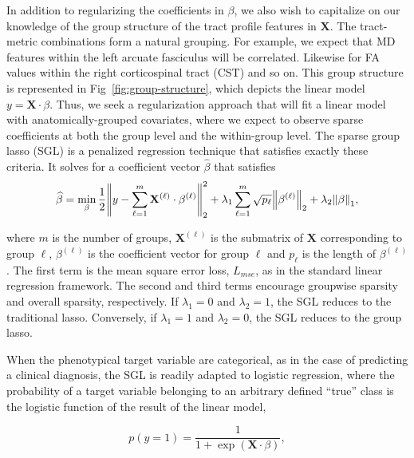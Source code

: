 In addition to regularizing the coefficients in $\beta$, we also wish to
capitalize on our knowledge of the group structure of the tract profile features
in $\mathbf{X}$. The tract-metric combinations form a natural grouping. For
example, we expect that MD features within the left arcuate fasciculus will be
correlated. Likewise for FA values within the right corticospinal tract (CST)
and so on. This group structure is represented in Fig~\ref{fig:group-structure},
which depicts the linear model $y = \mathbf{X} \cdot \beta$. Thus, we seek a
regularization approach that will fit a linear model with anatomically-grouped
covariates, where we expect to observe sparse coefficients at both the group
level and the within-group level. The sparse group lasso (SGL) is a penalized
regression technique that satisfies exactly these
criteria\cite{simon2013sparse}. It solves for a coefficient vector
$\widehat{\beta}$ that satisfies
\begin{equation}
    \widehat{\beta} = \min_\beta \frac{1}{2}
    \norm*{y - \displaystyle \sum_{\ell = 1}^{m} \mathbf{X}^{(\ell)} \cdot \beta^{(\ell)}}_2^2
    + \lambda_1 \displaystyle \sum_{\ell = 1}^{m} \sqrt{p_\ell} \norm*{\beta^{(\ell)}}_2
    + \lambda_2 \norm*{\beta}_1,
    \label{eq:sgl}
\end{equation}

where $m$ is the number of groups, $\mathbf{X}^{(\ell)}$ is the submatrix of
$\mathbf{X}$ corresponding to group $\ell$, $\beta^{(\ell)}$ is the coefficient
vector for group $\ell$ and $p_\ell$ is the length of $\beta^{(\ell)}$. The
first term is the mean square error loss, $L_{mse}$, as in the standard linear
regression framework. The second and third terms encourage groupwise sparsity
and overall sparsity, respectively. If $\lambda_1 = 0$ and $\lambda_2 = 1$, the
SGL reduces to the traditional lasso\cite{tibshirani1996regression}. Conversely,
if $\lambda_1 = 1$ and $\lambda_2 = 0$, the SGL reduces to the group
lasso\cite{yuan2006model}.

When the phenotypical target variable are categorical, as in the case of
predicting a clinical diagnosis, the SGL is readily adapted to logistic
regression, where the probability of a target variable belonging to an arbitrary
defined ``true'' class is the logistic function of the result of the linear
model,

\begin{equation}
    p(y = 1) = \frac{1}{1 + \exp(\mathbf{X}\cdot \beta)},
    \label{eq:logit}
\end{equation}

